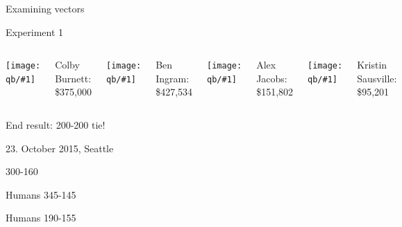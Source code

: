 \documentclass[compress]{beamer}
\newcommand{\fsi}[2]{
\begin{frame}[plain]
\vspace*{-1pt}
\makebox[\linewidth]{\texttt{[image: \#1]}}
\begin{center}
#2
\end{center}
\end{frame}
}
\newcommand{\gfxq}[2]{
\begin{center}
	\texttt{[image: qb/\#1]}
\end{center}
}
\begin{document}
\begin{frame}{Examining vectors}

  \only<1>{\gfxq{mann}{.65}}

\end{frame}

\begin{frame}{Experiment 1}

		\begin{columns}
				\gfxq{colby_jeo}{1.0}
                                Colby Burnett:
                                \$375,000
				\gfxq{ben_jeo}{1.0}
                                Ben Ingram:
                                \$427,534
				\gfxq{alex_jeo}{1.0}
                                Alex Jacobs: \$151,802
				\gfxq{kristin_jeo}{1.0}
                                Kristin Sausville: \$95,201
		\end{columns}

                \pause


                \begin{center}
                End result: 200-200 tie!
                \end{center}

\end{frame}

\fsi{qb/hsnct1}{}
\fsi{qb/jennings}{23. October 2015, Seattle}
\fsi{qb/jennings_handshake}{300-160}

\fsi{qb/hsnct_2016}{Humans 345-145}
\fsi{qb/nasat}{Humans 190-155}
\end{document}
